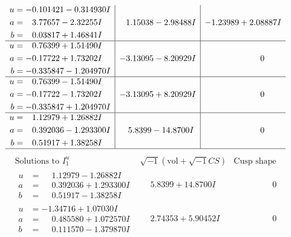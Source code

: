 \documentclass[1p]{elsarticle_modified}
\theoremstyle{definition}
\newcommand{\I}{\sqrt{-1}}
\begin{document}
$$\begin{array}{c|c|c}
\begin{aligned}
u &= -0.101421 - 0.314930 I \\
a &= \phantom{-}3.77657 - 2.32255 I \\
b &= \phantom{-}0.03817 + 1.46841 I\end{aligned}
 & \phantom{-}1.15038 - 2.98488 I & -1.23989 + 2.08887 I \\ \hline\begin{aligned}
u &= \phantom{-}0.76399 + 1.51490 I \\
a &= -0.17722 + 1.73202 I \\
b &= -0.335847 - 1.204970 I\end{aligned}
 & -3.13095 - 8.20929 I & \phantom{-0.000000 } 0 \\ \hline\begin{aligned}
u &= \phantom{-}0.76399 - 1.51490 I \\
a &= -0.17722 - 1.73202 I \\
b &= -0.335847 + 1.204970 I\end{aligned}
 & -3.13095 + 8.20929 I & \phantom{-0.000000 } 0 \\ \hline\begin{aligned}
u &= \phantom{-}1.12979 + 1.26882 I \\
a &= \phantom{-}0.392036 - 1.293300 I \\
b &= \phantom{-}0.51917 + 1.38258 I\end{aligned}
 & \phantom{-}5.8399 - 14.8700 I & \phantom{-0.000000 } 0\\
 \hline 
 \end{array}$$\newpage$$\begin{array}{c|c|c}  
\text{Solutions to }I^u_{1}& \I (\text{vol} + \sqrt{-1}CS) & \text{Cusp shape}\\
 \hline 
\begin{aligned}
u &= \phantom{-}1.12979 - 1.26882 I \\
a &= \phantom{-}0.392036 + 1.293300 I \\
b &= \phantom{-}0.51917 - 1.38258 I\end{aligned}
 & \phantom{-}5.8399 + 14.8700 I & \phantom{-0.000000 } 0 \\ \hline\begin{aligned}
u &= -1.34716 + 1.07030 I \\
a &= \phantom{-}0.485580 + 1.072570 I \\
b &= \phantom{-}0.111570 - 1.379870 I\end{aligned}
 & \phantom{-}2.74353 + 5.90452 I & \phantom{-0.000000 } 0 \\ \hline\begin{aligned}

\end{aligned}
\end{array}$$
\end{document}
